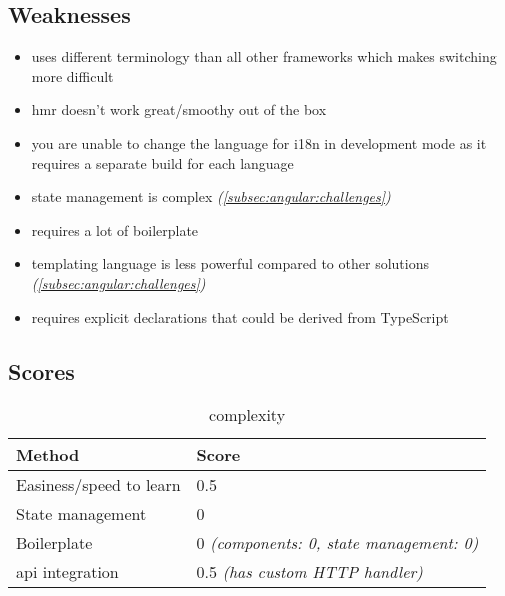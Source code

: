 \subsection{Weaknesses}
\label{subsec:angular:weaknesses}
\begin{itemize}
    \item uses different terminology than all other frameworks which makes switching more difficult
    \item \acrshort{hmr} doesn't work great/smoothy out of the box
    \item you are unable to change the language for \acrshort{i18n} in development mode as it requires a separate build for each language
    \item state management is complex \textit{(\autoref{subsec:angular:challenges})}
    \item requires a lot of boilerplate
    \item templating language is less powerful compared to other solutions \textit{(\autoref{subsec:angular:challenges})}
    \item requires explicit declarations that could be derived from TypeScript
\end{itemize}


\subsection{Scores}
\label{subsec:angular:scores}

\begin{table}[H]
    \centering
    \begin{tabular}{|l|l|}
        \hline
        \textbf{Method}            & \textbf{Score}                                  \\
        \hline
        Easiness/speed to learn    & 0.5                                             \\ \hline
        State management           & 0                                               \\ \hline
        Boilerplate                & 0 \textit{(components: 0, state management: 0)} \\ \hline
        \acrshort{api} integration & 0.5 \textit{(has custom HTTP handler)}          \\ \hline
    \end{tabular}
    \caption{complexity}
    \label{tab:angular:complexity}
\end{table}


